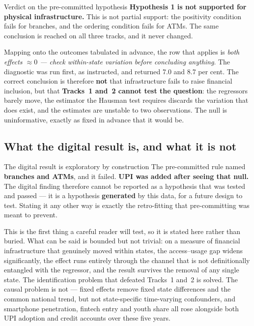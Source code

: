 \begin{keybox}{Verdict on the pre-committed hypothesis}
\textbf{Hypothesis 1 is not supported for physical infrastructure.} This is not partial support:
the positivity condition fails for branches, and the ordering condition fails for ATMs. The same
conclusion is reached on all three tracks, and it never changed.
\end{keybox}

\noindent
Mapping onto the outcomes tabulated in advance, the row that applies is \emph{both effects
$\approx 0$ --- check within-state variation before concluding anything}. The diagnostic was run
first, as instructed, and returned 7.0 and 8.7 per cent. The correct conclusion is therefore
\textbf{not} that infrastructure fails to raise financial inclusion, but that \textbf{Tracks~1
and~2 cannot test the question}: the regressors barely move, the estimator the Hausman test
requires discards the variation that does exist, and the estimates are unstable to two
observations. The null is uninformative, exactly as fixed in advance that it would be.

\subsection{What the digital result is, and what it is not}
\label{sec:h1-exploratory}

\begin{keybox}{The digital result is exploratory by construction}
The pre-committed rule named \textbf{branches and ATMs}, and it failed. \textbf{UPI was added after
seeing that null.} The digital finding therefore cannot be reported as a hypothesis that was tested
and passed --- it is a hypothesis \textbf{generated} by this data, for a future design to test.
Stating it any other way is exactly the retro-fitting that pre-committing was meant to prevent.
\end{keybox}

\noindent
This is the first thing a careful reader will test, so it is stated here rather than buried. What
can be said is bounded but not trivial: on a measure of financial infrastructure that genuinely
moved within states, the access--usage gap widens significantly, the effect runs entirely through
the channel that is not definitionally entangled with the regressor, and the result survives the
removal of any single state. The identification problem that defeated Tracks~1 and~2 is solved. The
causal problem is not --- fixed effects remove fixed state differences and the common national
trend, but not state-specific time-varying confounders, and smartphone penetration, fintech entry
and youth share all rose alongside both UPI adoption and credit accounts over these five years.

